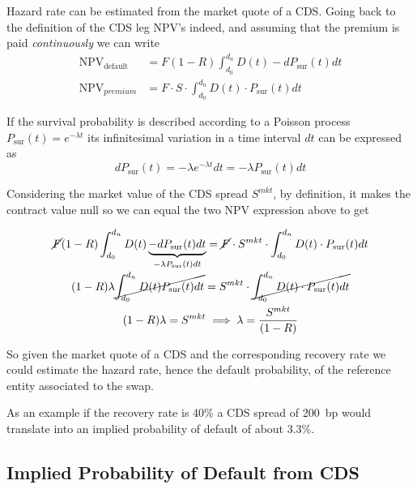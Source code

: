 Hazard rate can be estimated from the market quote of a CDS. Going back to the definition of the CDS leg NPV's indeed, and assuming that the premium is paid \emph{continuously} we can write
\begin{equation}
  \begin{aligned}
    \mathrm{NPV_{default}} &= F(1-R) \int_{d_0}^{d_n} D(t) -dP_{\textrm{sur}}(t) dt \\
    \textrm{NPV}_{premium} &= F\cdot S \cdot \int_{d_0}^{d_n} D(t) \cdot P_{\textrm{sur}}(t) dt 
  \end{aligned}
\end{equation}

If the survival probability is described according to a Poisson process $P_{\textrm{sur}}(t) = e^{−\lambda t}$ its infinitesimal variation in a time interval $dt$ can be expressed as
\begin{equation*}
  dP_{\textrm{sur}}(t) = -\lambda e^{−\lambda t} dt = -\lambda P_{\textrm{sur}}(t) dt 
\end{equation*}

Considering the market value of the CDS spread $S^{mkt}$, by definition, it makes the contract value null so we can equal the two NPV expression above to get

\begin{equation*}
  \begin{gathered}
    \cancel{F}(1-R) \int_{d_0}^{d_n} D(t) \underbrace{-dP_{\textrm{sur}}(t) dt}_{-\lambda  P_{\textrm{sur}}(t) dt} =  \cancel{F}\cdot S^{mkt} \cdot \int_{d_0}^{d_n} D(t) \cdot P_{\textrm{sur}}(t) dt \\
    (1-R) \lambda \cancel{\int_{d_0}^{d_n} D(t) P_{\textrm{sur}}(t) dt} =  S^{mkt} \cdot \cancel{\int_{d_0}^{d_n} D(t) \cdot P_{\textrm{sur}}(t) dt} \\
    (1-R) \lambda = S^{mkt} \implies  \lambda = \frac{ S^{mkt}}{(1-R)}
  \end{gathered}
\end{equation*}

So given the market quote of a CDS and the corresponding recovery rate we could estimate the hazard rate, hence the default probability, of the reference entity associated to the swap.

As an example if the recovery rate is 40\% a CDS spread of 200~bp would translate into an implied probability of default of about 3.3\%.

\subsection{Implied Probability of Default from CDS}
\label{default-probabilities-and-cds}

